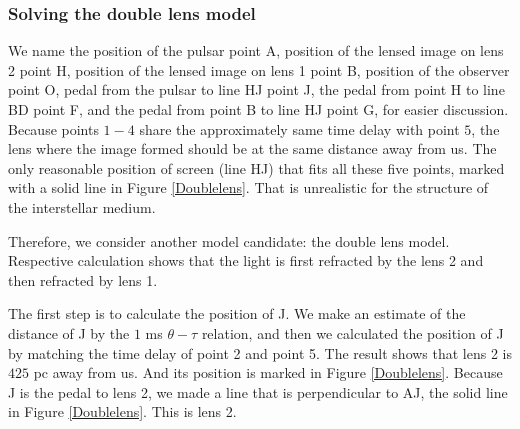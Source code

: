 \documentclass[useAMS,usenatbib]{mn2e}
\begin{document}
\subsubsection{Solving the double lens model}
We name the position of the pulsar point A, position of the lensed image on lens 2 point H, position of the lensed image on lens 1 point B, position of the observer point O, pedal from the pulsar to line HJ point J, the pedal from point H to line BD point F, and the pedal from point B to line HJ point G, for easier discussion.
Because points $1-4$ share the approximately same time delay with point $5$, the lens where the image formed should be at the same distance away from us. The only reasonable position of screen (line HJ) that fits all these five points, marked with a solid line in Figure \ref{Doublelens}.  
That is unrealistic for the structure of the interstellar medium. 

Therefore, we consider another model candidate: the double lens model. Respective calculation shows that the light is first refracted by the lens 2 and then refracted by lens 1. 

The first step is to calculate the position of J. We make an estimate of the distance of J by the $1$ ms $\theta-\tau$ relation, and then we calculated the position of J by matching the time delay of point 2 and point 5. The result shows that lens 2 is $425$ pc away from us. And its position is marked in Figure \ref{Doublelens}. Because J is the pedal to lens 2, we made a line that is perpendicular to AJ, the solid line in Figure \ref{Doublelens}. This is lens 2.
\end{document}

